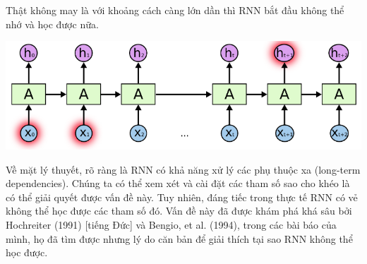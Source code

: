 Thật không may là với khoảng cách càng lớn dần thì RNN bắt đầu không thể nhớ và học được nữa.
\begin{center}
    \includegraphics[scale=.3]{image/chapter6/ptx2.png}
    \begin{figure}[htp]
    \begin{center}
     
    \end{center}
    \end{figure}
\end{center}
Về mặt lý thuyết, rõ ràng là RNN có khả năng xử lý các phụ thuộc xa (long-term dependencies). Chúng ta có thể xem xét và cài đặt các tham số sao cho khéo là có thể giải quyết được vấn đề này. Tuy nhiên, đáng tiếc trong thực tế RNN có vẻ không thể học được các tham số đó. Vấn đề này đã được khám phá khá sâu bởi Hochreiter (1991) [tiếng Đức] và Bengio, et al. (1994), trong các bài báo của mình, họ đã tìm được nhưng lý do căn bản để giải thích tại sao RNN không thể học được.


